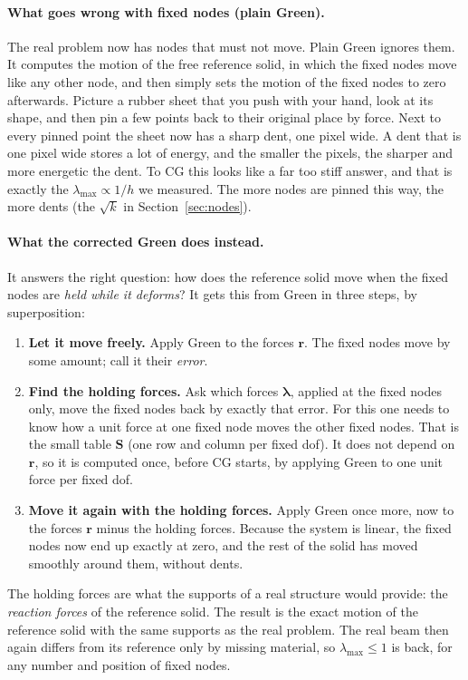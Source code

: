 \documentclass[11pt,a4paper]{article}
\begin{document}
\paragraph{What goes wrong with fixed nodes (plain Green).} The real problem now has nodes that must not move. Plain
Green ignores them. It computes the motion of the free reference solid, in which the fixed nodes move like any other
node, and then simply sets the motion of the fixed nodes to zero afterwards. Picture a rubber sheet that you push with
your hand, look at its shape, and then pin a few points back to their original place by force. Next to every pinned
point the sheet now has a sharp dent, one pixel wide. A dent that is one pixel wide stores a lot of energy, and the
smaller the pixels, the sharper and more energetic the dent. To CG this looks like a far too stiff answer, and that is
exactly the $\lambda_{\max} \propto 1/h$ we measured. The more nodes are pinned this way, the more dents (the
$\sqrt{k}$ in Section~\ref{sec:nodes}).

\paragraph{What the corrected Green does instead.} It answers the right question: how does the reference solid move
when the fixed nodes are \emph{held while it deforms}? It gets this from Green in three steps, by superposition:
\begin{enumerate}
  \item \textbf{Let it move freely.} Apply Green to the forces $\mathbf{r}$. The fixed nodes move by some amount; call it
        their \emph{error}.
  \item \textbf{Find the holding forces.} Ask which forces $\boldsymbol{\lambda}$, applied at the fixed nodes only, move
        the fixed nodes back by exactly that error. For this one needs to know how a unit force at one fixed node
        moves the other fixed nodes. That is the small table $\mathbf{S}$ (one row and column per fixed dof). It does
        not depend on $\mathbf{r}$, so it is computed once, before CG starts, by applying Green to one unit force per
        fixed dof.
  \item \textbf{Move it again with the holding forces.} Apply Green once more, now to the forces $\mathbf{r}$ minus the
        holding forces. Because the system is linear, the fixed nodes now end up exactly at zero, and the rest of the
        solid has moved smoothly around them, without dents.
\end{enumerate}
The holding forces are what the supports of a real structure would provide: the \emph{reaction forces} of the
reference solid. The result is the exact motion of the reference solid with the same supports as the real problem.
The real beam then again differs from its reference only by missing material, so $\lambda_{\max} \le 1$ is back, for
any number and position of fixed nodes.
\end{document}
